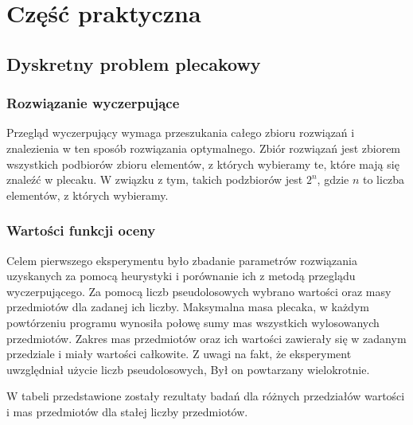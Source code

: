     \section{Część praktyczna}
    \subsection{Dyskretny problem plecakowy}
    \subsubsection{Rozwiązanie wyczerpujące}
    
    Przegląd wyczerpujący wymaga przeszukania całego zbioru rozwiązań i znalezienia w ten sposób rozwiązania optymalnego. Zbiór rozwiązań jest zbiorem wszystkich podbiorów zbioru elementów, z których wybieramy te, które mają się znaleźć w plecaku. W związku z tym, takich podzbiorów jest $2^n$, gdzie $n$ to liczba elementów, z których wybieramy.
    
    \subsubsection{Wartości funkcji oceny}
    
    Celem pierwszego eksperymentu było zbadanie parametrów rozwiązania uzyskanych za pomocą heurystyki i porównanie ich z metodą przeglądu wyczerpującego. Za pomocą liczb pseudolosowych wybrano wartości oraz masy przedmiotów dla zadanej ich liczby. Maksymalna masa plecaka, w każdym powtórzeniu programu wynosiła połowę sumy mas wszystkich wylosowanych przedmiotów. Zakres mas przedmiotów oraz ich wartości zawierały się w zadanym przedziale i miały wartości całkowite. Z uwagi na fakt, że eksperyment uwzględniał użycie liczb pseudolosowych, Był on powtarzany wielokrotnie.
    
    W tabeli przedstawione zostały rezultaty badań dla różnych przedziałów wartości i mas przedmiotów dla stałej liczby przedmiotów.
    

